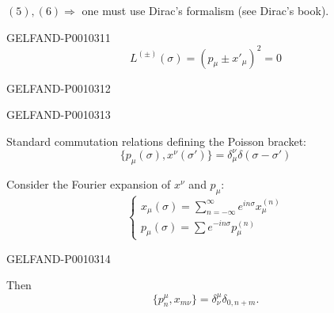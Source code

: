$(5),(6)\Rightarrow$ one must use Dirac's formalism (see Dirac's book).


\begin{GelfandAdjacentEvidence}{GELFAND-P001031}{1}
\begin{equation*}
L^{(\pm)}(\sigma)=(p_\mu\pm x'_\mu)^2=0
\tag{7}
\end{equation*}
\end{GelfandAdjacentEvidence}
\begin{GelfandAdjacentEvidence}{GELFAND-P001031}{2}

\end{GelfandAdjacentEvidence}
\begin{GelfandAdjacentEvidence}{GELFAND-P001031}{3}


Standard commutation relations defining the Poisson bracket:
\begin{equation*}
\{p_\mu(\sigma),x^\nu(\sigma')\}=\delta^\nu_\mu\delta(\sigma-\sigma')
\tag{8}
\end{equation*}

Consider the Fourier expansion of $x^\nu$ and $p_\mu$:
\begin{equation*}
\begin{cases}
x_\mu(\sigma)=\displaystyle\sum_{n=-\infty}^{\infty}e^{in\sigma}x_\mu^{(n)}\\[.5ex]
p_\mu(\sigma)=\displaystyle\sum e^{-in\sigma}p_\mu^{(n)}
\end{cases}
\tag{9}
\end{equation*}
\end{GelfandAdjacentEvidence}
\begin{GelfandAdjacentEvidence}{GELFAND-P001031}{4}


Then
\begin{equation*}
\{p^\mu_n,x_{m\nu}\}=\delta^\mu_\nu\delta_{0,n+m}.
\tag{10}
\end{equation*}
\end{GelfandAdjacentEvidence}
